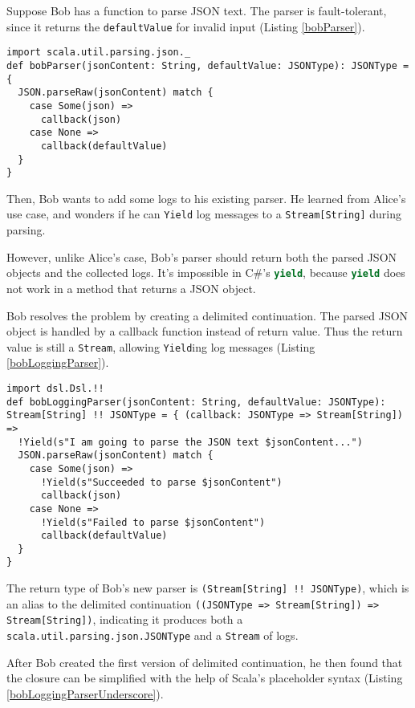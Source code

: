 Suppose Bob has a function to parse JSON text. The parser is fault-tolerant, since it returns the \lstinline{defaultValue} for invalid input  (Listing \ref{bobParser}).

\begin{lstlisting}[caption={The original implementation of Bob's parser},label={bobParser}]
import scala.util.parsing.json._
def bobParser(jsonContent: String, defaultValue: JSONType): JSONType = {
  JSON.parseRaw(jsonContent) match {
    case Some(json) =>
      callback(json)
    case None =>
      callback(defaultValue)
  }
}
\end{lstlisting}

Then, Bob wants to add some logs to his existing parser. He learned from Alice's use case, and wonders if he can \lstinline{Yield} log messages to a \lstinline{Stream[String]} during parsing.

However, unlike Alice's case, Bob's parser should return both the parsed JSON objects and the collected logs. It's impossible in C\#'s \lstinline[language=Python]{yield}, because \lstinline[language=Python]{yield} does not work in a method that returns a JSON object.

Bob resolves the problem by creating a delimited continuation. The parsed JSON object is handled by a callback function instead of return value. Thus the return value is still a \lstinline{Stream}, allowing \lstinline{Yield}ing log messages (Listing \ref{bobLoggingParser}).

\begin{lstlisting}[caption={The implementation of Bob's logging parser},label={bobLoggingParser}]
import dsl.Dsl.!!
def bobLoggingParser(jsonContent: String, defaultValue: JSONType): Stream[String] !! JSONType = { (callback: JSONType => Stream[String]) =>
  !Yield(s"I am going to parse the JSON text $jsonContent...")
  JSON.parseRaw(jsonContent) match {
    case Some(json) =>
      !Yield(s"Succeeded to parse $jsonContent")
      callback(json)
    case None =>
      !Yield(s"Failed to parse $jsonContent")
      callback(defaultValue)
  }
}
\end{lstlisting}

The return type of Bob's new parser is \lstinline{(Stream[String] !! JSONType)}, which is an alias to the delimited continuation \lstinline{((JSONType => Stream[String]) => Stream[String])}, indicating it produces both a \lstinline{scala.util.parsing.json.JSONType} and a \lstinline{Stream} of logs.

After Bob created the first version of delimited continuation, he then found that the closure can be simplified with the help of Scala's placeholder syntax (Listing \ref{bobLoggingParserUnderscore}).

